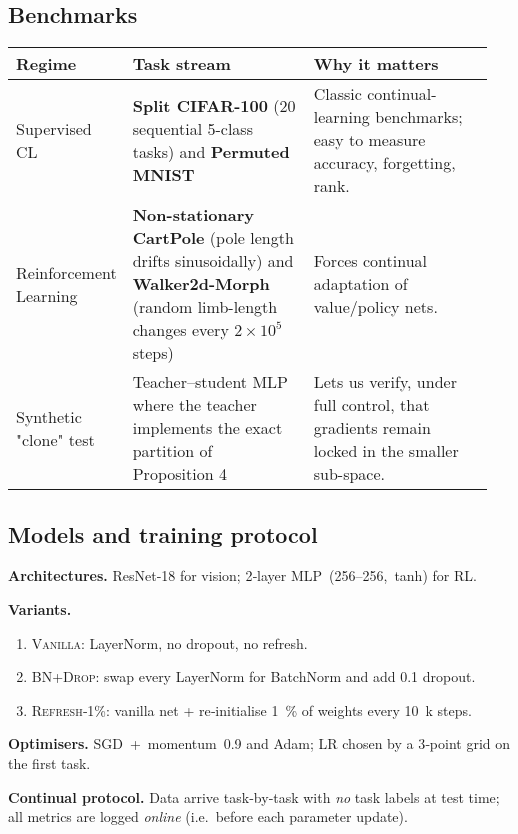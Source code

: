 \documentclass[11pt]{article}
\begin{document}
\subsection{Benchmarks}

\begin{table}[htbp]
\centering
\begin{tabular}{p{0.15\linewidth} p{0.4\linewidth} p{0.4\linewidth}}
\toprule
\textbf{Regime} & \textbf{Task stream} & \textbf{Why it matters} \\
\midrule
Supervised CL & \textbf{Split CIFAR-100} (20 sequential 5-class tasks) and \textbf{Permuted MNIST} & Classic continual-learning benchmarks; easy to measure accuracy, forgetting, rank. \\
\midrule
Reinforcement Learning & \textbf{Non-stationary CartPole} (pole length drifts sinusoidally) and \textbf{Walker2d-Morph} (random limb-length changes every $2 \times 10^5$ steps) & Forces continual adaptation of value/policy nets. \\
\midrule
Synthetic "clone" test & Teacher--student MLP where the teacher implements the exact partition of Proposition 4 & Lets us verify, under full control, that gradients remain locked in the smaller sub-space. \\
\bottomrule
\end{tabular}
\end{table}


\subsection{Models and training protocol}

\textbf{Architectures.}  
ResNet‑18 for vision; 2‑layer MLP (256–256, tanh) for RL.

\textbf{Variants.}
\begin{enumerate}[nosep,leftmargin=*,label=(\alph*)]
  \item \textsc{Vanilla}: LayerNorm, no dropout, no refresh.  
  \item \textsc{BN+Drop}: swap every LayerNorm for BatchNorm and add 0.1 dropout.  
  \item \textsc{Refresh‑1\%}: vanilla net + re‑initialise 1 \% of weights every 10 k steps.  
\end{enumerate}

\textbf{Optimisers.}  
SGD + momentum 0.9 and Adam; LR chosen by a 3‑point grid on the first task.

\textbf{Continual protocol.}  
Data arrive task‑by‑task with \emph{no} task labels at test time; all metrics are logged \emph{online} (i.e.\ before each parameter update).
\end{document}
